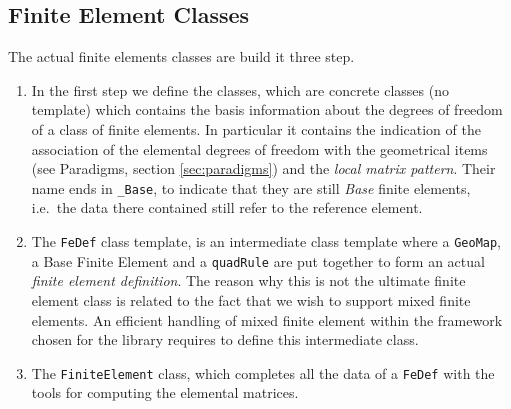 \subsection{Finite Element Classes}
The actual finite elements classes are build it three  step. 
\begin{enumerate}
\item  In the first 
step we define the \emph{}
classes, which are concrete classes (no template) which contains the basis information about 
the degrees of freedom of a class of finite elements. In particular it contains the
indication of the association of the elemental degrees of freedom with the geometrical items
(see Paradigms, section \ref{sec:paradigms}) and the \emph{local matrix pattern}.
Their name ends in \texttt{\_Base}, to indicate that they are still \emph{Base} finite elements,
i.e.\  the data there contained still refer to the reference element.
\item The \texttt{FeDef} class template, is an intermediate class
  template where a \texttt{GeoMap}, a Base Finite Element  and
  a \texttt{quadRule} are put together to form an actual \emph{finite
    element definition}. The reason why this is not the ultimate finite
  element class is related to the fact that we wish to support mixed
  finite elements. An efficient handling of mixed finite element
  within the framework chosen for the library requires to define this
  intermediate class.
\item The \texttt{FiniteElement} class, which completes all the data of
  a \texttt{FeDef} with the tools for computing the elemental matrices.
\end{enumerate}



